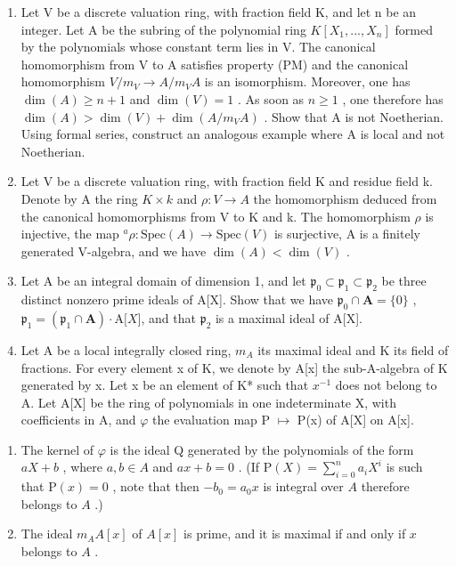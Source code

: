 
\begin{enumerate}
\def\labelenumi{\arabic{enumi})}
\item
  Let V be a discrete valuation ring, with fraction field K, and let n be an integer. Let A be the subring of the polynomial ring \(K[X_{1},...,X_{n}]\) formed by the polynomials whose constant term lies in V. The canonical homomorphism from V to A satisfies property (PM) and the canonical homomorphism \(V/m_{V} \rightarrow A/m_{V}A\) is an isomorphism. Moreover, one has \(\dim(A) \geqslant n + 1\) and \(\dim(V) = 1\) . As soon as \(n \geqslant 1\) , one therefore has \(\dim(A) > \dim(V) + \dim(A/m_{V}A)\) . Show that A is not Noetherian. Using formal series, construct an analogous example where A is local and not Noetherian.
\item
  Let V be a discrete valuation ring, with fraction field K and residue field k. Denote by A the ring \(K \times k\) and \(\rho : V \to A\) the homomorphism deduced from the canonical homomorphisms from V to K and k. The homomorphism \(\rho\) is injective, the map \(^{a}\rho : \text{Spec}(A) \to \text{Spec}(V)\) is surjective, A is a finitely generated V-algebra, and we have \(\dim(A) < \dim(V)\) .
\item
  Let A be an integral domain of dimension 1, and let \(\mathfrak{p}_0 \subset \mathfrak{p}_1 \subset \mathfrak{p}_2\) be three distinct nonzero prime ideals of A{[}X{]}. Show that we have \(\mathfrak{p}_0 \cap \mathbf{A} = \{0\}\) , \(\mathfrak{p}_1 = (\mathfrak{p}_1 \cap \mathbf{A})\cdot\mathrm{A}{[}X{]}\), and that \(\mathfrak{p}_2\) is a maximal ideal of A{[}X{]}.
\item
  Let A be a local integrally closed ring, \(m_A\) its maximal ideal and K its field of fractions. For every element x of K, we denote by A{[}x{]} the sub-A-algebra of K generated by x. Let x be an element of K* such that \(x^{-1}\) does not belong to A. Let A{[}X{]} be the ring of polynomials in one indeterminate X, with coefficients in A, and \(\varphi\) the evaluation map P \(\mapsto\) P(x) of A{[}X{]} on A{[}x{]}.
\end{enumerate}

\begin{enumerate}
\def\labelenumi{\alph{enumi})}
\item
  The kernel of \(\varphi\) is the ideal Q generated by the polynomials of the form \(aX + b\) , where \(a, b \in A\) and \(ax + b = 0\) . (If \(\mathrm{P}(X) = \sum_{i=0}^{n} a_i X^i\) is such that \(\mathrm{P}(x) = 0\) , note that then \(-b_0 = a_0 x\) is integral over \(A\) therefore belongs to \(A\) .)
\item
  The ideal \(m_A A[x]\) of \(A[x]\) is prime, and it is maximal if and only if \(x\) belongs to \(A\) .
\end{enumerate}

